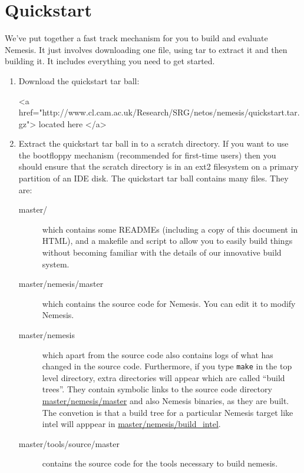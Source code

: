 \documentclass[a4paper]{article}
\newcommand{\cmd}[1]{\texttt{#1}}
\newcommand{\dir}[1]{\url{#1}}
\begin{document}
\section{Quickstart}

We've put together a fast track mechanism for you to build and
evaluate Nemesis. It just involves downloading one file, using tar to
extract it and then building it. It includes everything you need to
get started.

\begin{enumerate}

\item Download the quickstart tar ball:
\begin{rawhtml}
<a href="http://www.cl.cam.ac.uk/Research/SRG/netos/nemesis/quickstart.tar.gz">
located here </a>
\end{rawhtml}

\item Extract the quickstart tar ball in to a scratch directory. If
you want to use the bootfloppy mechanism (recommended for first-time
users) then you should ensure that the scratch directory is in an ext2
filesystem on a primary partition of an IDE disk. The quickstart tar
ball contains many files. They are:

\begin{description}
\item[master/] which contains some READMEs (including a copy of this
document in HTML), and a makefile and script to allow you to easily
build things without becoming familiar with the details of our
innovative build system.

\item[master/nemesis/master] which contains the source code for
Nemesis. You can edit it to modify Nemesis.

\item[master/nemesis] which apart from the source code also contains
logs of what has changed in the source code. Furthermore, if you type
\cmd{make} in the top level directory, extra directories will
appear which are called ``build trees''. They contain symbolic links
to the source code directory \dir{master/nemesis/master} and also
Nemesis binaries, as they are built. The convetion is that a build
tree for a particular Nemesis target like intel will apppear in
\dir{master/nemesis/build_intel}.

\item[master/tools/source/master] contains the source code for the
tools necessary to build nemesis.


\end{description}
\end{enumerate}
\end{document}
